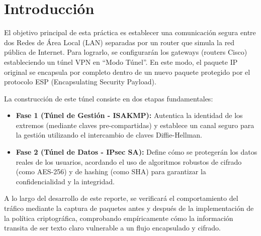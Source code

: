 \section{Introducción}

El objetivo principal de esta práctica es establecer una comunicación segura entre dos Redes de Área Local (LAN) separadas por un router que simula la red pública de Internet. Para lograrlo, se configurarán los gateways (routers Cisco) estableciendo un túnel VPN en ``Modo Túnel''. En este modo, el paquete IP original se encapsula por completo dentro de un nuevo paquete protegido por el protocolo ESP (Encapsulating Security Payload).

La construcción de este túnel consiste en dos etapas fundamentales:
\begin{itemize}
    \item \textbf{Fase 1 (Túnel de Gestión - ISAKMP):} Autentica la identidad de los extremos (mediante claves pre-compartidas) y establece un canal seguro para la gestión utilizando el intercambio de claves Diffie-Hellman.
    \item \textbf{Fase 2 (Túnel de Datos - IPsec SA):} Define cómo se protegerán los datos reales de los usuarios, acordando el uso de algoritmos robustos de cifrado (como AES-256) y de hashing (como SHA) para garantizar la confidencialidad y la integridad.
\end{itemize}

A lo largo del desarrollo de este reporte, se verificará el comportamiento del tráfico mediante la captura de paquetes antes y después de la implementación de la política criptográfica, comprobando empíricamente cómo la información transita de ser texto claro vulnerable a un flujo encapsulado y cifrado.